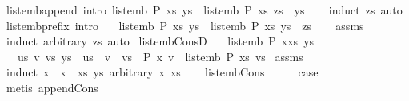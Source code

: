 \begin{isabellebody}
\isanewline
{}\isamarkupfalse%
\ list{\isacharunderscore}emb{\isacharunderscore}append{}\ {\isacharbrackleft}intro{\isacharbrackright}{\isacharcolon}\ {\isachardoublequoteopen}list{\isacharunderscore}emb\ P\ xs\ ys\ {\isasymLongrightarrow}\ list{\isacharunderscore}emb\ P\ xs\ {\isacharparenleft}zs\ {\isacharat}\ ys{\isacharparenright}{\isachardoublequoteclose}\isanewline
%
\isadelimproof
\ \ %
\endisadelimproof
%
\isatagproof
{}\isamarkupfalse%
\ {\isacharparenleft}induct\ zs{\isacharparenright}\ auto%
\endisatagproof
{\isafoldproof}%
%
\isadelimproof
\isanewline
%
\endisadelimproof
\isanewline
{}\isamarkupfalse%
\ list{\isacharunderscore}emb{\isacharunderscore}prefix\ {\isacharbrackleft}intro{\isacharbrackright}{\isacharcolon}\isanewline
\ \ \ {\isachardoublequoteopen}list{\isacharunderscore}emb\ P\ xs\ ys{\isachardoublequoteclose}\ \ {\isachardoublequoteopen}list{\isacharunderscore}emb\ P\ xs\ {\isacharparenleft}ys\ {\isacharat}\ zs{\isacharparenright}{\isachardoublequoteclose}\isanewline
%
\isadelimproof
\ \ %
\endisadelimproof
%
\isatagproof
{}\isamarkupfalse%
\ assms\isanewline
\ \ \isamarkupfalse%
\ {\isacharparenleft}induct\ arbitrary{\isacharcolon}\ zs{\isacharparenright}\ auto%
\endisatagproof
{\isafoldproof}%
%
\isadelimproof
\isanewline
%
\endisadelimproof
\isanewline
{}\isamarkupfalse%
\ list{\isacharunderscore}emb{\isacharunderscore}ConsD{\isacharcolon}\isanewline
\ \ \ {\isachardoublequoteopen}list{\isacharunderscore}emb\ P\ {\isacharparenleft}x{\isacharhash}xs{\isacharparenright}\ ys{\isachardoublequoteclose}\isanewline
\ \ \ {\isachardoublequoteopen}{\isasymexists}us\ v\ vs{\isachardot}\ ys\ {\isacharequal}\ us\ {\isacharat}\ v\ {\isacharhash}\ vs\ {\isasymand}\ P\ x\ v\ {\isasymand}\ list{\isacharunderscore}emb\ P\ xs\ vs{\isachardoublequoteclose}\isanewline
%
\isadelimproof
%
\endisadelimproof
%
\isatagproof
{}\isamarkupfalse%
\ assms\isanewline
{}\isamarkupfalse%
\ {\isacharparenleft}induct\ x\ {\isasymequiv}\ {\isachardoublequoteopen}x\ {\isacharhash}\ xs{\isachardoublequoteclose}\ ys\ arbitrary{\isacharcolon}\ x\ xs{\isacharparenright}\isanewline
\ \ \isamarkupfalse%
\ list{\isacharunderscore}emb{\isacharunderscore}Cons\isanewline
\ \ \isamarkupfalse%
\ \isamarkupfalse%
\ {\isacharquery}case\ \isamarkupfalse%
\ {\isacharparenleft}metis\ append{\isacharunderscore}Cons{\isacharparenright}\isanewline

\end{isabellebody}

